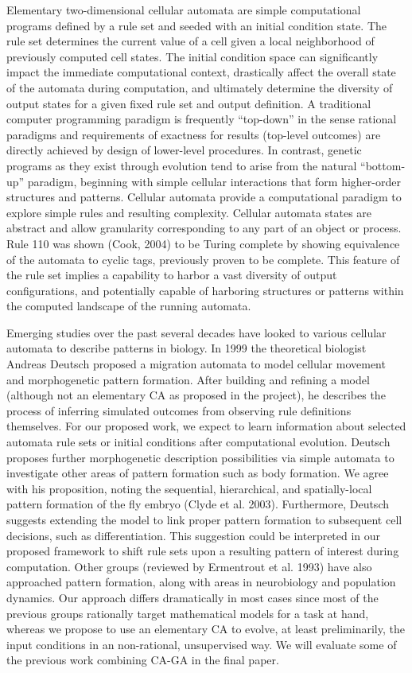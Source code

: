 \documentclass[twocolumn]{article}
\begin{document}
Elementary two-dimensional cellular automata are simple computational programs defined by a rule set and seeded with an initial condition state.  The rule set determines the current value of a cell given a local neighborhood of previously computed cell states.  The initial condition space can significantly impact the immediate computational context, drastically affect the overall state of the automata during computation, and ultimately determine the diversity of output states for a given fixed rule set and output definition.
A traditional computer programming paradigm is frequently ``top-down'' in the sense rational paradigms and requirements of exactness for results (top-level outcomes) are directly achieved by design of lower-level procedures.  In contrast, genetic programs as they exist through evolution tend to arise from the natural ``bottom-up'' paradigm, beginning with simple cellular interactions that form higher-order structures and patterns.
Cellular automata provide a computational paradigm to explore simple rules and resulting complexity.  Cellular automata states are abstract and allow granularity corresponding to any part of an object or process.  Rule 110 was shown (Cook, 2004) to be Turing complete by showing equivalence of the automata to cyclic tags, previously proven to be complete.  This feature of the rule set implies a capability to harbor a vast diversity of output configurations, and potentially capable of harboring structures or patterns within the computed landscape of the running automata.

Emerging studies over the past several decades have looked to various cellular automata to describe patterns in biology.  In 1999 the theoretical biologist Andreas Deutsch proposed a migration automata to model cellular movement and morphogenetic pattern formation.  After building and refining a model (although not an elementary CA as proposed in the project), he describes the process of inferring simulated outcomes from observing rule definitions themselves.  For our proposed work, we expect to learn information about selected automata rule sets or initial conditions after computational evolution.  Deutsch proposes further morphogenetic description possibilities via simple automata to investigate other areas of pattern formation such as body formation.  We agree with his proposition, noting the sequential, hierarchical, and spatially-local pattern formation of the fly embryo (Clyde et al. 2003).  Furthermore, Deutsch suggests extending the model to link proper pattern formation to subsequent cell decisions, such as differentiation.  This suggestion could be interpreted in our proposed framework to shift rule sets upon a resulting pattern of interest during computation.  Other groups (reviewed by Ermentrout et al. 1993) have also approached pattern formation, along with areas in neurobiology and population dynamics.  Our approach differs dramatically in most cases since most of the previous groups rationally target mathematical models for a task at hand, whereas we propose to use an elementary CA to evolve, at least preliminarily, the input conditions in an non-rational, unsupervised way. 
We will evaluate some of the previous work combining CA-GA in the final paper.
\end{document}
